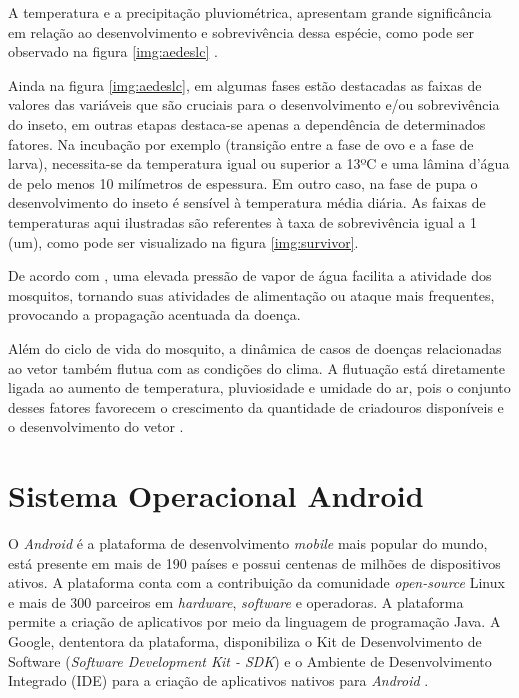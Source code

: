 A temperatura e a precipitação pluviométrica, apresentam grande significância em relação ao desenvolvimento e sobrevivência dessa espécie, como pode ser observado na figura \ref{img:aedeslc} \cite{hopp2001global, ribeiro2006associaccao}. 

\newpage


Ainda na figura \ref{img:aedeslc}, em algumas fases estão destacadas as faixas de valores das variáveis que são cruciais para o desenvolvimento e/ou sobrevivência do inseto, em outras etapas destaca-se apenas a dependência de determinados fatores. Na incubação por exemplo (transição entre a fase de ovo e a fase de larva), necessita-se da temperatura igual ou superior a 13ºC e uma lâmina d’água de pelo menos 10 milímetros de espessura. Em outro caso, na fase de pupa o desenvolvimento do inseto é sensível à temperatura média diária. As faixas de temperaturas aqui ilustradas são referentes à taxa de sobrevivência igual a 1 (um), como pode ser visualizado na figura \ref{img:survivor}. 


De acordo com , uma elevada pressão de vapor de água facilita a atividade dos mosquitos, tornando suas atividades de alimentação ou ataque mais frequentes, provocando a propagação acentuada da doença.

Além do ciclo de vida do mosquito, a dinâmica de casos de doenças relacionadas ao vetor também flutua com as condições do clima. A flutuação está diretamente ligada ao aumento de temperatura, pluviosidade e umidade do ar, pois o conjunto desses fatores favorecem o crescimento da quantidade de criadouros disponíveis e o desenvolvimento do vetor \cite{ribeiro2006associaccao}.

\section{Sistema Operacional Android}

O \textit{Android} é a plataforma de desenvolvimento \textit{mobile} mais popular do mundo, está presente em mais de 190 países e possui centenas de milhões de dispositivos ativos. A plataforma conta com a contribuição da comunidade \textit{open-source} Linux e mais de 300 parceiros em \textit{hardware}, \textit{software} e operadoras. A plataforma permite a criação de aplicativos por meio da linguagem de programação Java. A Google, dententora da plataforma, disponibiliza o Kit de Desenvolvimento de Software (\textit{Software Development Kit - SDK}) e o Ambiente de Desenvolvimento Integrado (IDE) para a criação de aplicativos nativos para \textit{Android} \cite{SITEANDROID}.

